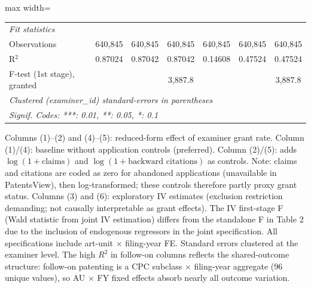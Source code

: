 \begin{table}[htbp]
\begin{adjustbox}{max width=\textwidth}
\begin{tabular}{lcccccc}
      \midrule
      \emph{Fit statistics}\\
      Observations                        & 640,845         & 640,845         & 640,845        & 640,845        & 640,845        & 640,845\\  
      R$^2$                               & 0.87024         & 0.87042         & 0.87042        & 0.14608        & 0.47524        & 0.47524\\  
      F-test (1st stage), granted         &                 &                 & 3,887.8        &                &                & 3,887.8\\  
      \midrule \midrule
      \multicolumn{7}{l}{\emph{Clustered (examiner\_id) standard-errors in parentheses}}\\
      \multicolumn{7}{l}{\emph{Signif. Codes: ***: 0.01, **: 0.05, *: 0.1}}\\
   \end{tabular}
   \end{adjustbox}

   \par \raggedright 
   Columns (1)--(2) and (4)--(5): reduced-form effect of examiner grant rate. Column (1)/(4): baseline without application controls (preferred). Column (2)/(5): adds $\log(1 + \text{claims})$ and $\log(1 + \text{backward citations})$ as controls. Note: claims and citations are coded as zero for abandoned applications (unavailable in PatentsView), then log-transformed; these controls therefore partly proxy grant status. Columns (3) and (6): exploratory IV estimates (exclusion restriction demanding; not causally interpretable as grant effects). The IV first-stage F (Wald statistic from joint IV estimation) differs from the standalone F in Table 2 due to the inclusion of endogenous regressors in the joint specification. All specifications include art-unit $\times$ filing-year FE. Standard errors clustered at the examiner level. The high $R^2$ in follow-on columns reflects the shared-outcome structure: follow-on patenting is a CPC subclass $\times$ filing-year aggregate (96 unique values), so AU $\times$ FY fixed effects absorb nearly all outcome variation.
\end{table}


